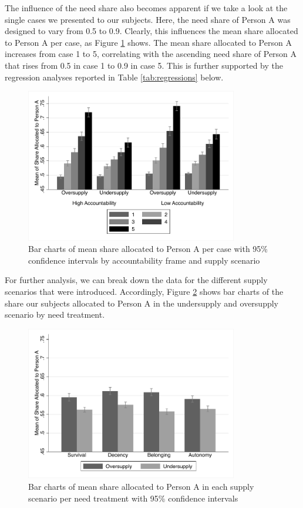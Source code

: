 \documentclass[egregdoesnotlikesansseriftitles]{scrartcl}
\begin{document}
The influence of the need share also becomes apparent if we take a look at the single cases we presented to our subjects.
Here, the need share of Person A was designed to vary from 0.5 to 0.9.
Clearly, this influences the mean share allocated to Person A per case, as Figure \ref{fig:figure_2} shows.
The mean share allocated to Person A increases from case 1 to 5, correlating with the ascending need share of Person A that rises from 0.5 in case 1 to 0.9 in case 5.
This is further supported by the regression analyses reported in Table \ref{tab:regressions} below.

\begin{figure}[ht]
   \centering
   \includegraphics[width=25em]{figures/figure_2.pdf}
   \caption{Bar charts of mean share allocated to Person A per case with 95\% confidence intervals by accountability frame and supply scenario}
   \label{fig:figure_2}
\end{figure}

For further analysis, we can break down the data for the different supply scenarios that were introduced.
Accordingly, Figure \ref{fig:figure_3} shows bar charts of the share our subjects allocated to Person A in the undersupply and oversupply scenario by need treatment.

\begin{figure}[ht]
   \centering
   \includegraphics[width=25em]{figures/figure_3.pdf}
   \caption{Bar charts of mean share allocated to Person A in each supply scenario per need treatment with 95\% confidence intervals}
   \label{fig:figure_3}
\end{figure}
\end{document}

